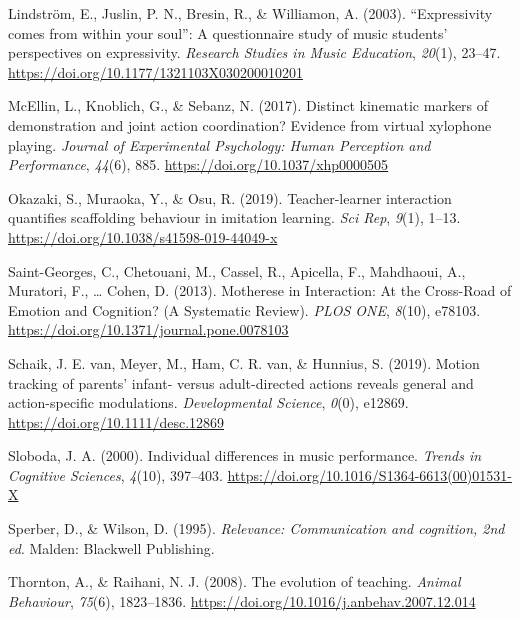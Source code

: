 \documentclass[
  english,
  man,floatsintext]{apa6}
\newlength{\cslhangindent}
\newenvironment{CSLReferences}[2] %
 {%
  \setlength{\parindent}{0pt}
  \ifodd #1 \everypar{\setlength{\hangindent}{\cslhangindent}}\ignorespaces\fi
  \ifnum #2 > 0
  \setlength{\parskip}{#2\baselineskip}
  \fi
 }%
 {}
\begin{document}
\begin{CSLReferences}{1}{0}
\leavevmode{}%
Lindström, E., Juslin, P. N., Bresin, R., \& Williamon, A. (2003). {``{Expressivity} comes from within your soul''}: {A} questionnaire study of music students' perspectives on expressivity. \emph{Research Studies in Music Education}, \emph{20}(1), 23--47. \url{https://doi.org/10.1177/1321103X030200010201}

\leavevmode{}%
McEllin, L., Knoblich, G., \& Sebanz, N. (2017). Distinct kinematic markers of demonstration and joint action coordination? {Evidence} from virtual xylophone playing. \emph{Journal of Experimental Psychology: Human Perception and Performance}, \emph{44}(6), 885. \url{https://doi.org/10.1037/xhp0000505}

\leavevmode{}%
Okazaki, S., Muraoka, Y., \& Osu, R. (2019). Teacher-learner interaction quantifies scaffolding behaviour in imitation learning. \emph{Sci Rep}, \emph{9}(1), 1--13. \url{https://doi.org/10.1038/s41598-019-44049-x}

\leavevmode{}%
Saint-Georges, C., Chetouani, M., Cassel, R., Apicella, F., Mahdhaoui, A., Muratori, F., \ldots{} Cohen, D. (2013). Motherese in {Interaction}: {At} the {Cross}-{Road} of {Emotion} and {Cognition}? ({A Systematic Review}). \emph{PLOS ONE}, \emph{8}(10), e78103. \url{https://doi.org/10.1371/journal.pone.0078103}

\leavevmode{}%
Schaik, J. E. van, Meyer, M., Ham, C. R. van, \& Hunnius, S. (2019). Motion tracking of parents' infant- versus adult-directed actions reveals general and action-specific modulations. \emph{Developmental Science}, \emph{0}(0), e12869. \url{https://doi.org/10.1111/desc.12869}

\leavevmode{}%
Sloboda, J. A. (2000). Individual differences in music performance. \emph{Trends in Cognitive Sciences}, \emph{4}(10), 397--403. \url{https://doi.org/10.1016/S1364-6613(00)01531-X}

\leavevmode{}%
Sperber, D., \& Wilson, D. (1995). \emph{Relevance: {Communication} and cognition, 2nd ed}. {Malden}: {Blackwell Publishing}.

\leavevmode{}%
Thornton, A., \& Raihani, N. J. (2008). The evolution of teaching. \emph{Animal Behaviour}, \emph{75}(6), 1823--1836. \url{https://doi.org/10.1016/j.anbehav.2007.12.014}


\end{CSLReferences}
\end{document}
